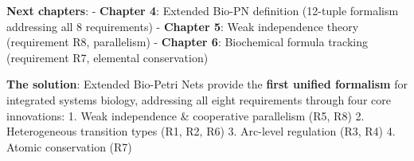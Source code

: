 \textbf{Next chapters}: - \textbf{Chapter 4}: Extended Bio-PN definition
(12-tuple formalism addressing all 8 requirements) - \textbf{Chapter 5}:
Weak independence theory (requirement R8, parallelism) - \textbf{Chapter
6}: Biochemical formula tracking (requirement R7, elemental
conservation)

\textbf{The solution}: Extended Bio-Petri Nets provide the \textbf{first
unified formalism} for integrated systems biology, addressing all eight
requirements through four core innovations: 1. Weak independence \&
cooperative parallelism (R5, R8) 2. Heterogeneous transition types (R1,
R2, R6) 3. Arc-level regulation (R3, R4) 4. Atomic conservation (R7)
